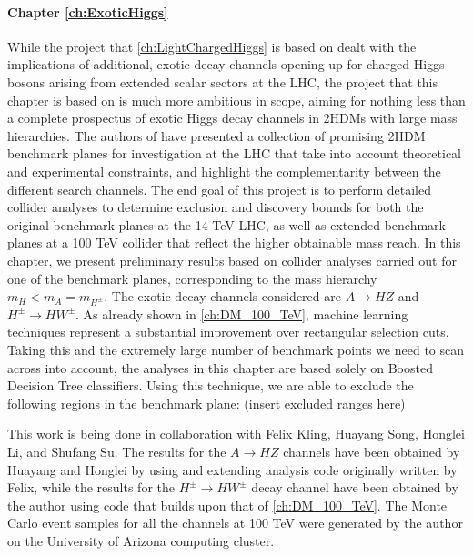 \paragraph{Chapter \ref{ch:ExoticHiggs}}
While the project that \autoref{ch:LightChargedHiggs} is based on dealt with the implications of additional, exotic decay channels opening up for charged Higgs bosons arising from extended scalar sectors at the LHC, the project that this chapter is based on is much more ambitious in scope, aiming for nothing less than a complete prospectus of exotic Higgs decay channels in 2HDMs with large mass hierarchies. The authors of \citep{Kling2016} have presented a collection of promising 2HDM benchmark planes for investigation at the LHC that take into account theoretical and experimental constraints, and highlight the complementarity between the different search channels. The end goal of this project is to perform detailed collider analyses to determine exclusion and discovery bounds for both the original benchmark planes at the 14 TeV LHC, as well as extended benchmark planes at a 100 TeV collider that reflect the higher obtainable mass reach. In this chapter, we present preliminary results based on collider analyses carried out for one of the benchmark planes, corresponding to the mass hierarchy $m_H < m_A = m_{H^\pm}$. The exotic decay channels considered are $A\rightarrow HZ$ and $H^\pm\rightarrow HW^\pm$. As already shown in \autoref{ch:DM_100_TeV}, machine learning techniques represent a substantial improvement over rectangular selection cuts. Taking this and the extremely large number of benchmark points we need to scan across into account, the analyses in this chapter are based solely on Boosted Decision Tree classifiers. Using this technique, we are able to exclude the following regions in the benchmark plane: (insert excluded ranges here)

This work is being done in collaboration with Felix Kling, Huayang Song, Honglei Li, and Shufang Su. The results for the $A\rightarrow HZ$ channels have been obtained by Huayang and Honglei by using and extending analysis code originally written by Felix, while the results for the $H^\pm\rightarrow HW^\pm$ decay channel have been obtained by the author using code that builds upon that of \autoref{ch:DM_100_TeV}. The Monte Carlo event samples for all the channels at 100 TeV were generated by the author on the University of Arizona computing cluster. 

